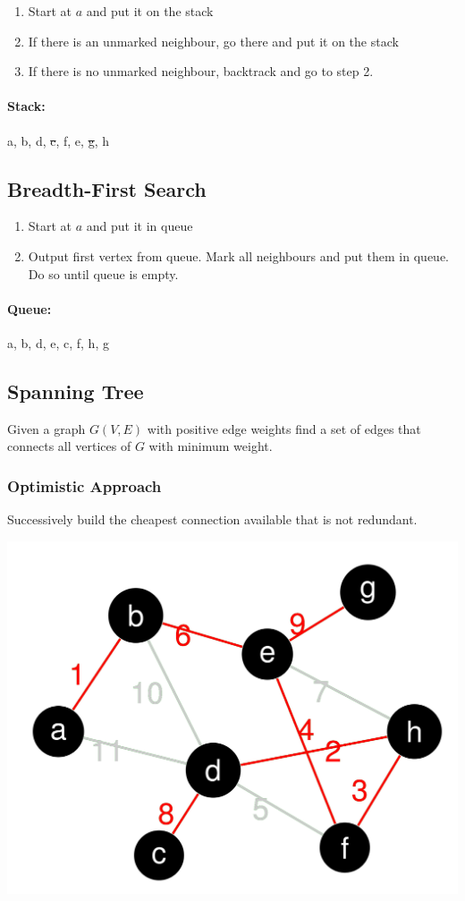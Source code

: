 \documentclass[11pt]{article}
\begin{document}
\begin{enumerate}
	\item Start at $a$ and put it on the stack
	\item If there is an unmarked neighbour, go there and put it on the stack
	\item If there is no unmarked neighbour, backtrack and go to step 2.
\end{enumerate}

\paragraph{Stack:} a, b, d, \sout{c}, f, e, \sout{g}, h

\subsection{Breadth-First Search}

\begin{enumerate}
	\item Start at $a$ and put it in queue
	\item Output first vertex from queue. Mark all neighbours and put them in queue. Do so until queue is empty.
\end{enumerate}
\paragraph{Queue:} a, b, d, e, c, f, h, g

\subsection{Spanning Tree}
Given a graph $G(V,E)$ with positive edge weights find a set of edges that connects all vertices of $G$ with minimum weight.

\subsubsection{Optimistic Approach}
Successively build the cheapest connection available that is not redundant.

\begin{center}
	\includegraphics[width=0.6\linewidth]{spanning_tree_optimistic}
\end{center}
\end{document}
